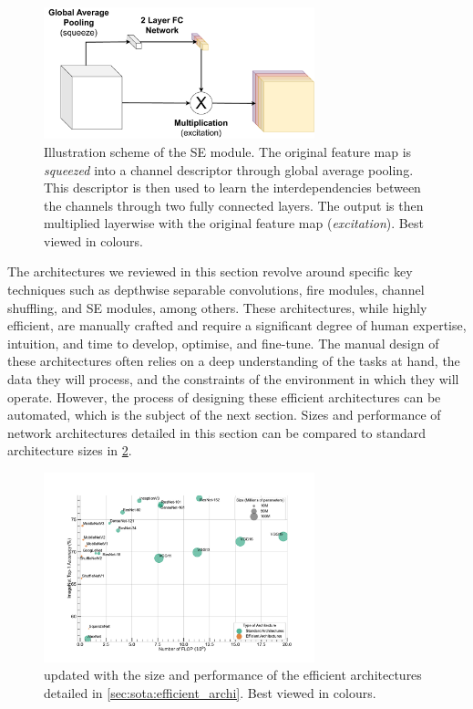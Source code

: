 
\begin{figure}[htbp]
  \centering
  \includegraphics[width=0.70\textwidth]{chapter_sota/assets/SE_module.pdf}
  \caption{Illustration scheme of the \acf{SE} module. The original feature
    map is \emph{squeezed} into a channel descriptor through global average
    pooling. This descriptor is then used to learn the interdependencies between
    the channels through two fully connected layers. The output is then
    multiplied layerwise with the original feature map (\emph{excitation}). Best
    viewed in colours.}
  \label{fig:sota:se_module}
\end{figure}


The architectures we reviewed in this section revolve around specific key
techniques such as depthwise separable convolutions, fire modules, channel
shuffling, and \ac{SE} modules, among others. These architectures, while highly
efficient, are manually crafted and require a significant degree of human
expertise, intuition, and time to develop, optimise, and fine-tune. The manual
design of these architectures often relies on a deep understanding of the tasks
at hand, the data they will process, and the constraints of the environment in
which they will operate. However, the process of designing these efficient
architectures can be automated, which is the subject of the next section. Sizes
and performance of network architectures detailed in this section can be
compared to standard architecture sizes in \cref{fig:sota:net_sizes_std_eff}.\\

\begin{figure}[htbp]
  \centering
  \includegraphics[width=0.70\textwidth]{chapter_sota/assets/network_sizes_normal_eff.pdf}
  \caption{ updated with the size and performance of the
    efficient architectures detailed in \cref{sec:sota:efficient_archi}. Best
    viewed in colours.}
  \label{fig:sota:net_sizes_std_eff}
\end{figure}





